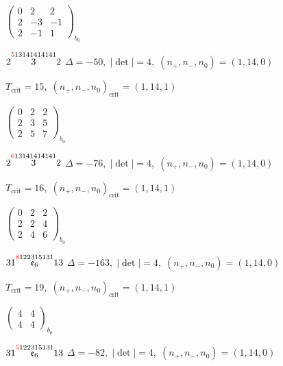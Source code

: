 \documentclass[10pt]{article}
\begin{document}
\hspace{2em}$\left(\begin{smallmatrix}0 & 2 & 2 \\ 2 & -3 & -1 \\ 2 & -1 & 1\end{smallmatrix}\right)_{\!b_0}$

\smallskip

$2\overset{\textcolor{red}{5}13141414141}{3}2$ \quad $\Delta=-50,\; |\det|=4,\; (n_+,n_-,n_0)=(1,14,0)$

\hspace{1em}$T_{\text{crit}}=15,\; (n_+,n_-,n_0)_{\text{crit}}=(1,14,1)$

\hspace{2em}$\left(\begin{smallmatrix}0 & 2 & 2 \\ 2 & 3 & 5 \\ 2 & 5 & 7\end{smallmatrix}\right)_{\!b_0}$

$2\overset{\textcolor{red}{6}13141414141}{3}2$ \quad $\Delta=-76,\; |\det|=4,\; (n_+,n_-,n_0)=(1,14,0)$

\hspace{1em}$T_{\text{crit}}=16,\; (n_+,n_-,n_0)_{\text{crit}}=(1,14,1)$

\hspace{2em}$\left(\begin{smallmatrix}0 & 2 & 2 \\ 2 & 2 & 4 \\ 2 & 4 & 6\end{smallmatrix}\right)_{\!b_0}$

\smallskip

$31\overset{\textcolor{red}{8}122315131}{\mathfrak{e}_6}13$ \quad $\Delta=-163,\; |\det|=4,\; (n_+,n_-,n_0)=(1,14,0)$

\hspace{1em}$T_{\text{crit}}=19,\; (n_+,n_-,n_0)_{\text{crit}}=(1,14,1)$

\hspace{2em}$\left(\begin{smallmatrix}4 & 4 \\ 4 & 4\end{smallmatrix}\right)_{\!b_0}$

$31\overset{\textcolor{red}{5}122315131}{\mathfrak{e}_6}13$ \quad $\Delta=-82,\; |\det|=4,\; (n_+,n_-,n_0)=(1,14,0)$
\end{document}
